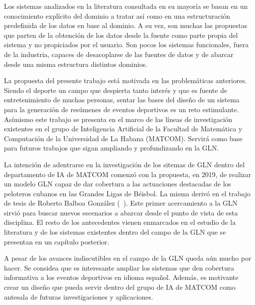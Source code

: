     Los sistemas analizados en la literatura consultada en su mayoría se basan en un conocimiento explícito del dominio a tratar así como en una 
estructuración predefinida de los datos en base al dominio. A su vez, son muchas las propuestas que parten de la obtención de los datos desde 
la fuente como parte propia del sistema y no propiciados por el usuario. Son pocos los sistemas funcionales, fuera de la industria, capaces de 
desacoplarse de las fuentes de datos y de abarcar desde una misma estructura distintos dominios.



    La propuesta del presente trabajo está motivada en las problemáticas anteriores. Siendo el deporte un campo que despierta tanto 
interés y que es fuente de entretenimiento de muchas personas, sentar las bases del diseño de un sistema para la generación de resúmenes de 
eventos deportivos es un reto estimulante. Asímismo este trabajo se presenta en el marco de las líneas de investigación existentes en el 
grupo de Inteligencia Artificial de la Facultad de Matemática y Computación de la Universidad de La Habana (MATCOM). Servirá como base 
para futuros trabajos que sigan ampliando y profundizando en la GLN.

    La intención de adentrarse en la investigación de los sitemas de GLN dentro del departamento de IA de MATCOM comenzó con la propuesta, en 2019, 
de realizar un modelo GLN capaz de dar cobertura a las actuaciones destacadas de los peloteros cubanos en las Grandes Ligas de Béisbol. La misma derivó 
en el trabajo de tesis de Roberto Balboa González (~\cite{balboa2020}). Este primer acercamiento a la GLN sirvió para buscar nuevos escenarios a abarcar 
desde el punto de vista de esta disciplina. El resto de los antecedentes vienen enmarcados en el estudio de la literatura y de los sistemas existentes dentro del campo de la GLN que 
se presentan en un capítulo posterior.

A pesar de los avances indiscutibles en el campo de la GLN queda aún mucho por hacer. Se considea que es interesante ampliar los sistemas que den cobertura informativa a los eventos 
deportivos en idioma español. Además, es motivante crear un diseño que pueda servir dentro del grupo de IA de MATCOM como antesala de futuras investigaciones y aplicaciones.


